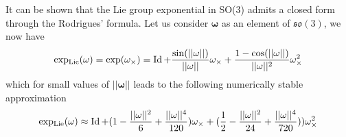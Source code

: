 It can be shown that the Lie group exponential in SO(3) admits a closed form through the Rodrigues’ formula. Let us consider $\mathbf{\omega}$ as an element of $\mathfrak{so}(3)$, we now have
\begin{equation}
\operatorname{exp_{Lie}}(\mathbf{\omega}) = \exp(\mathbf{\omega}_\times) = \operatorname{Id} + \frac{\sin(||\mathbf{\omega}||)}{||\mathbf{\omega}||}\mathbf{\omega}_\times + \frac{1-\cos(||\mathbf{\omega}||)}{||\mathbf{\omega}||^2}\mathbf{\omega}_\times^2
\end{equation}
which for small values of $||\mathbf{\omega}||$ leads to the following numerically stable approximation
\begin{equation}
\operatorname{exp_{Lie}}(\mathbf{\omega}) \approx \operatorname{Id}
+ (1-\frac{||\mathbf{\omega}||^2}{6}+\frac{||\mathbf{\omega}||^4}{120})\mathbf{\omega}_\times
+ (\frac{1}{2}-\frac{||\mathbf{\omega}||^2}{24}+\frac{||\mathbf{\omega}||^4}{720}))\mathbf{\omega}_\times^2
\end{equation}

\iffalse
For compatibility with the 3D cross product, we choose the following basis for the matrix representation of $\mathfrak{se}(3)$:
\begin{align}
e_1 &= 
\begin{bmatrix}
0 & 0 & 0  & 0 \\
0 & 0 & -1 & 0 \\
0 & 1 & 0  & 0 \\
0 & 0 & 0  & 0
\end{bmatrix}
\\
e_2 &=
\begin{bmatrix}
0  & 0 & 1 & 0 \\
0  & 0 & 0 & 0 \\
-1 & 0 & 0 & 0 \\
0  & 0 & 0 & 0
\end{bmatrix}
\\
e_3 &=
\begin{bmatrix}
0 & -1 & 0 & 0 \\
1 & 0  & 0 & 0 \\
0 & 0  & 0 & 0 \\
0 & 0  & 0 & 0
\end{bmatrix}
\\
e_4 &=
\begin{bmatrix}
0 & 0 & 0 & 1 \\
0 & 0 & 0 & 0 \\
0 & 0 & 0 & 0 \\
0 & 0 & 0 & 0
\end{bmatrix}
\\
e_5 &=
\begin{bmatrix}
0 & 0 & 0 & 0 \\
0 & 0 & 0 & 1 \\
0 & 0 & 0 & 0 \\
0 & 0 & 0 & 0
\end{bmatrix}
\\
e_6 &=
\begin{bmatrix}
0 & 0 & 0 & 0 \\
0 & 0 & 0 & 0 \\
0 & 0 & 0 & 1 \\
0 & 0 & 0 & 0
\end{bmatrix}
\end{align}
\fi


